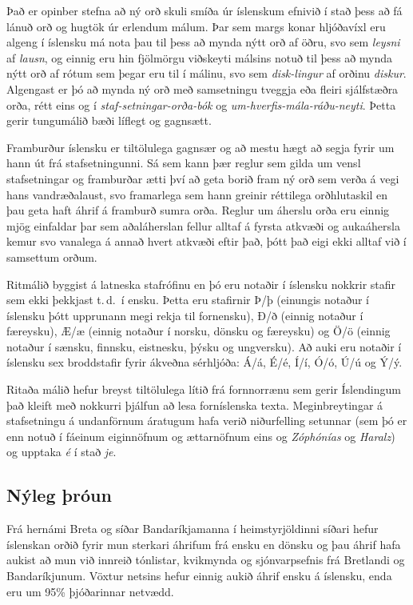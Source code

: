 \documentclass{../../metanetpaper}
\begin{document}
\begin{multicols}{2}
Það er opinber stefna að ný orð skuli smíða úr íslenskum efnivið í stað þess að fá lánuð orð og hugtök úr erlendum málum. Þar sem margs konar hljóðavíxl eru algeng í íslensku má nota þau til þess að mynda nýtt orð af öðru, svo sem \textit{leysni} af \textit{lausn}, og einnig eru hin fjölmörgu viðskeyti málsins notuð til þess að mynda nýtt orð af rótum sem þegar eru til í málinu, svo sem \textit{disk-lingur} af orðinu \textit{diskur}. Algengast er þó að mynda ný orð með samsetningu tveggja eða fleiri sjálfstæðra orða, rétt eins og í \textit{staf-setningar-orða-bók} og \textit{um-hverfis-mála-ráðu-neyti}. Þetta gerir tungumálið bæði líflegt og gagnsætt.


Framburður íslensku er tiltölulega gagnsær og að mestu hægt að segja fyrir um hann út frá stafsetningunni. Sá sem kann þær reglur sem gilda um vensl stafsetningar og framburðar ætti því að geta borið fram ný orð sem verða á vegi hans vandræðalaust, svo framarlega sem hann greinir réttilega orðhlutaskil en þau geta haft áhrif á framburð sumra orða. Reglur um áherslu orða eru einnig mjög einfaldar þar sem aðaláherslan fellur alltaf á fyrsta atkvæði og aukaáhersla kemur svo vanalega á annað hvert atkvæði eftir það, þótt það eigi ekki alltaf við í samsettum orðum.

Ritmálið byggist á latneska stafrófinu en þó eru notaðir í íslensku nokkrir stafir sem ekki þekkjast t.\,d.~í ensku. Þetta eru stafirnir Þ/þ (einungis notaður í íslensku þótt upprunann megi rekja til fornensku), Ð/ð (einnig notaður í færeysku), Æ/æ (einnig notaður í norsku, dönsku og færeysku) og Ö/ö (einnig notaður í sænsku, finnsku, eistnesku, þýsku og ungversku). Að auki eru notaðir í íslensku sex broddstafir fyrir ákveðna sérhljóða: Á/á, É/é, Í/í, Ó/ó, Ú/ú og Ý/ý.

Ritaða málið hefur breyst tiltölulega lítið frá fornnorrænu sem gerir Íslendingum það kleift með nokkurri þjálfun að lesa forníslenska texta. Meginbreytingar á stafsetningu á undanförnum áratugum hafa verið niðurfelling setunnar (sem þó er enn notuð í fáeinum eiginnöfnum og ættarnöfnum eins og \textit{Zóphónías} og \textit{Haralz}) og upptaka \textit{é} í stað \textit{je}.

\subsection{Nýleg þróun}

Frá hernámi Breta og síðar Bandaríkjamanna í heimstyrjöldinni síðari hefur íslenskan orðið fyrir mun sterkari áhrifum frá ensku en dönsku og þau áhrif hafa aukist að mun við innreið tónlistar, kvikmynda og sjónvarpsefnis frá Bretlandi og Bandaríkjunum. Vöxtur netsins hefur einnig aukið áhrif ensku á íslensku, enda eru um 95\% þjóðarinnar netvædd. 


\end{multicols}
\end{document}
